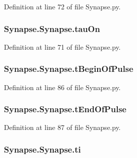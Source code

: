 Definition at line 72 of file Synapse.\-py.

\hypertarget{class_synapse_1_1_synapse_aae46f8edd1e94ea2ab51e3612afd3a3f}{
\subsubsection[{tau\-On}]{\setlength{\rightskip}{0pt plus 5cm}Synapse.\-Synapse.\-tau\-On}}\label{class_synapse_1_1_synapse_aae46f8edd1e94ea2ab51e3612afd3a3f}


Definition at line 71 of file Synapse.\-py.

\hypertarget{class_synapse_1_1_synapse_acdc426c52a2a13183d5f8c54a830bfa2}{
\subsubsection[{t\-Begin\-Of\-Pulse}]{\setlength{\rightskip}{0pt plus 5cm}Synapse.\-Synapse.\-t\-Begin\-Of\-Pulse}}\label{class_synapse_1_1_synapse_acdc426c52a2a13183d5f8c54a830bfa2}


Definition at line 86 of file Synapse.\-py.

\hypertarget{class_synapse_1_1_synapse_adfd02fa815d45efd0cb1bc0124fe2c90}{
\subsubsection[{t\-End\-Of\-Pulse}]{\setlength{\rightskip}{0pt plus 5cm}Synapse.\-Synapse.\-t\-End\-Of\-Pulse}}\label{class_synapse_1_1_synapse_adfd02fa815d45efd0cb1bc0124fe2c90}


Definition at line 87 of file Synapse.\-py.

\hypertarget{class_synapse_1_1_synapse_a714c95723607acad52af96ad55b6c575}{
\subsubsection[{ti}]{\setlength{\rightskip}{0pt plus 5cm}Synapse.\-Synapse.\-ti}}\label{class_synapse_1_1_synapse_a714c95723607acad52af96ad55b6c575}


